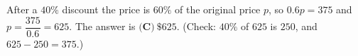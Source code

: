 After a $40\%$ discount the price is $60\%$ of the original price $p$, so $0.6p=375$ and $p=\dfrac{375}{0.6}=625$. The answer is $\boxed{\textbf{(C)}\ \$625}$. (Check: $40\%$ of $625$ is $250$, and $625-250=375$.)

